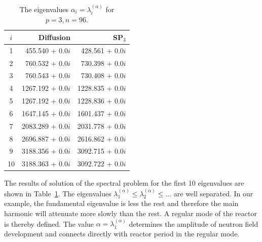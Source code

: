 \documentclass[authoryear]{elsarticle}
\begin{document}
\begin{table}[h]
\caption{The eigenvalues $\alpha_i=\lambda_i^{(\alpha)}$ for $p=3, n=96$.}
\label{tab:iaea_without_alpha_10}
\begin{center}
\begin{tabular}{c r r}
\hline
$i$ & Diffusion & SP$_3$ \\
\hline
1 & 455.540 + 0.0$i$& 428.561 + 0.0$i$ \\
2 & 760.532 + 0.0$i$& 730.398 + 0.0$i$ \\
3 & 760.543 + 0.0$i$& 730.408 + 0.0$i$ \\
4 & 1267.192 + 0.0$i$&1228.835 + 0.0$i$ \\
5 & 1267.192 + 0.0$i$&1228.836 + 0.0$i$ \\
6 & 1647.145 + 0.0$i$&1601.437 + 0.0$i$ \\
7 & 2083.289 + 0.0$i$&2031.778 + 0.0$i$ \\
8 & 2696.887 + 0.0$i$&2616.862 + 0.0$i$ \\
9 & 3188.356 + 0.0$i$&3092.715 + 0.0$i$ \\
10& 3188.363 + 0.0$i$&3092.722 + 0.0$i$ \\
\hline
\end{tabular}
\end{center}
\end{table}

The results of solution of the spectral problem for the first 10 eigenvalues are shown in Table~\ref{tab:iaea_without_alpha_10}.
The eigenvalues $\lambda_1^{(\alpha)} \leq \lambda_2^{(\alpha)} \leq ...$ are well separated. 
In our example, the fundamental eigenvalue is less the rest and therefore the main harmonic  will attenuate more slowly than the rest.
A regular mode of the reactor is thereby defined.
The value $\alpha = \lambda_1^{(\alpha)}$ determines the amplitude of neutron field development and connects directly with reactor period in the regular mode.
\end{document}
